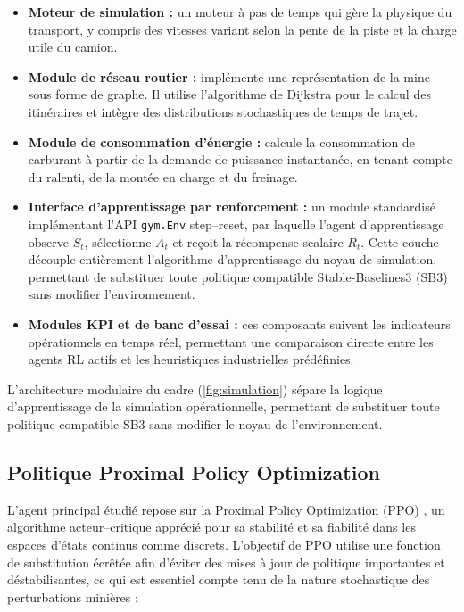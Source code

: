 \documentclass[11pt,a4paper]{article}
\begin{document}
\begin{itemize}
  \item \textbf{Moteur de simulation :} un moteur à pas de temps qui gère la physique du transport, y compris des vitesses variant selon la pente de la piste et la charge utile du camion.
  \item \textbf{Module de réseau routier :} implémente une représentation de la mine sous forme de graphe. Il utilise l'algorithme de Dijkstra pour le calcul des itinéraires et intègre des distributions stochastiques de temps de trajet.
  \item \textbf{Module de consommation d'énergie :} calcule la consommation de carburant à partir de la demande de puissance instantanée, en tenant compte du ralenti, de la montée en charge et du freinage.
  \item \textbf{Interface d'apprentissage par renforcement :} un module standardisé implémentant l'API \texttt{gym.Env} step--reset, par laquelle l'agent d'apprentissage observe $S_t$, sélectionne $A_t$ et reçoit la récompense scalaire $R_t$. Cette couche découple entièrement l'algorithme d'apprentissage du noyau de simulation, permettant de substituer toute politique compatible Stable-Baselines3 (SB3) sans modifier l'environnement.
  \item \textbf{Modules KPI et de banc d'essai :} ces composants suivent les indicateurs opérationnels en temps réel, permettant une comparaison directe entre les agents RL actifs et les heuristiques industrielles prédéfinies.
\end{itemize}

L'architecture modulaire du cadre (\cref{fig:simulation}) sépare la logique d'apprentissage de la simulation opérationnelle, permettant de substituer toute politique compatible SB3 sans modifier le noyau de l'environnement.

\subsection{Politique Proximal Policy Optimization}

L'agent principal étudié repose sur la Proximal Policy Optimization (PPO) \cite{JohnSchulman2017}, un algorithme acteur--critique apprécié pour sa stabilité et sa fiabilité dans les espaces d'états continus comme discrets. L'objectif de PPO utilise une fonction de substitution écrêtée afin d'éviter des mises à jour de politique importantes et déstabilisantes, ce qui est essentiel compte tenu de la nature stochastique des perturbations minières :
\end{document}
